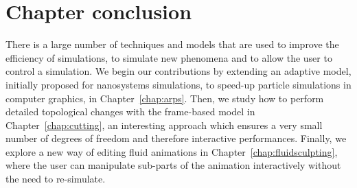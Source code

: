 \section{Chapter conclusion}
There is a large number of techniques and models that are used to improve the efficiency of simulations, to simulate new phenomena and to allow the user to control a simulation.
We begin our contributions by extending an adaptive model, initially proposed for nanosystems simulations, to speed-up particle simulations in computer graphics, in Chapter~\ref{chap:arps}.
Then, we study how to perform detailed topological changes with the frame-based model in Chapter~\ref{chap:cutting}, an interesting approach which ensures a very small number of degrees of freedom and therefore interactive performances.
Finally, we explore a new way of editing fluid animations in Chapter~\ref{chap:fluidsculpting}, where the user can manipulate sub-parts of the animation interactively without the need to re-simulate.
